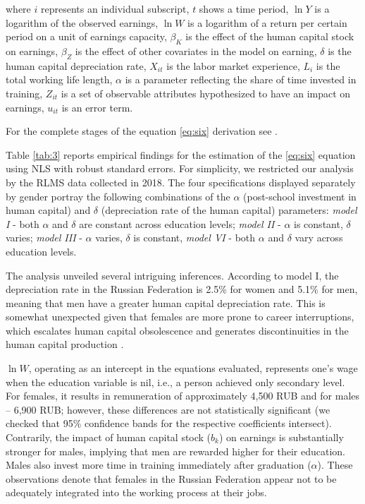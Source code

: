\documentclass[12pt,a4paper]{article}
\numberwithin{equation}{section}
\begin{document}
\noindent
where $i$ represents an individual subscript, $t$ shows a time period, $\ln Y$ is a logarithm of the observed earnings, $\ln W$ is a logarithm of a return per certain period on a unit of earnings capacity, $\beta_{K}$ is the effect of the human capital stock on earnings, $\beta_{Z}$ is the effect of other covariates in the model on earning, $\delta$ is the human capital depreciation rate, $X_{i t}$ is the labor market experience, $L_{i}$ is the total working life length, $\alpha$ is a parameter reflecting the share of time invested in training, $Z_{i t}$ is a set of observable attributes hypothesized to have an impact on earnings, $u_{i t}$ is an error term.

For the complete stages of the equation \ref{eq:six} derivation see \parencite{weber_173._2008}.

Table \ref{tab:3} reports empirical findings for the estimation of the \ref{eq:six} equation using NLS with robust standard errors. For simplicity, we restricted our analysis by the RLMS data collected in 2018. The four specifications displayed separately by gender portray the following combinations of the $\alpha$ (post-school investment in human capital) and $\delta$ (depreciation rate of the human capital) parameters: \textit{model I} - both $\alpha$ and $\delta$ are constant across education levels; \textit{model II} - $\alpha$ is constant, $\delta$ varies; \textit{model III} - $\alpha$ varies, $\delta$ is constant, \textit{model VI} - both $\alpha$ and $\delta$ vary across education levels.

The analysis unveiled several intriguing inferences. According to model I, the depreciation rate in the Russian Federation is 2.5\% for women and 5.1\% for men, meaning that men have a greater human capital depreciation rate. This is somewhat unexpected given that females are more prone to career interruptions, which escalates human capital obsolescence and generates discontinuities in the human capital production \parencite{weber_173._2008}.

$\ln W$, operating as an intercept in the equations evaluated, represents one's wage when the education variable is nil, i.e., a person achieved only secondary level. For females, it results in remuneration of approximately 4,500 RUB and for males -- 6,900 RUB; however, these differences are not statistically significant (we checked that 95\% confidence bands for the respective coefficients intersect). Contrarily, the impact of human capital stock ($b_k$) on earnings is substantially stronger for males, implying that men are rewarded higher for their education. Males also invest more time in training immediately after graduation ($\alpha$). These observations denote that females in the Russian Federation appear not to be adequately integrated into the working process at their jobs. 
\end{document}
